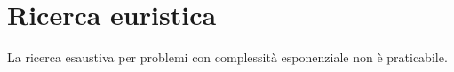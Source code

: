 \chapter{Ricerca euristica}
La ricerca esaustiva per problemi con complessit\`a esponenziale non \`e praticabile.
